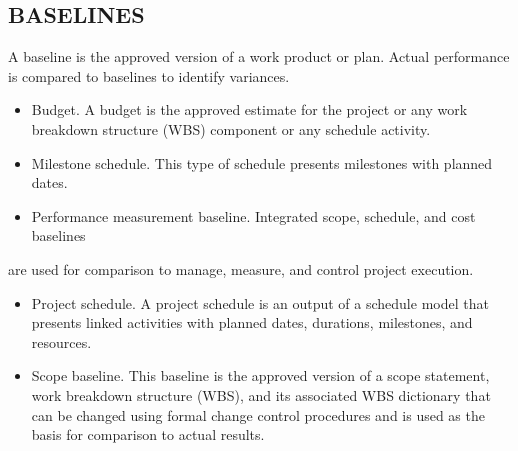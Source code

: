 \documentclass[11pt]{article}
\begin{document}
\subsection{BASELINES}
\label{sec:org7db18cb}
A baseline is the approved version of a work product or plan. Actual performance is compared to baselines to identify variances.
\begin{itemize}
\item Budget. A budget is the approved estimate for the project or any work breakdown structure (WBS) component or any schedule activity.
\item Milestone schedule. This type of schedule presents milestones with planned dates.
\item Performance measurement baseline. Integrated scope, schedule, and cost baselines
\end{itemize}
are used for comparison to manage, measure, and control project execution.
\begin{itemize}
\item Project schedule. A project schedule is an output of a schedule model that presents linked activities with planned dates, durations, milestones, and resources.
\item Scope baseline. This baseline is the approved version of a scope statement, work breakdown structure (WBS), and its associated WBS dictionary that can be changed using formal change control procedures and is used as the basis for comparison to actual results.
\end{itemize}
\end{document}
